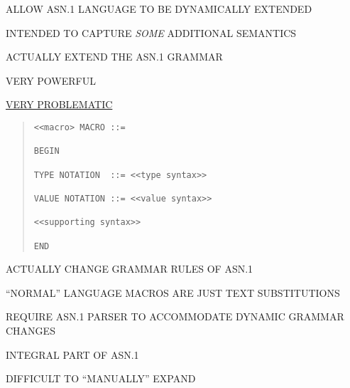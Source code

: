 

\begin{bwslide}

\begin{nrtc}
\item	ALLOW ASN.1 LANGUAGE TO BE DYNAMICALLY EXTENDED
\item	INTENDED TO CAPTURE {\em SOME} ADDITIONAL SEMANTICS
\item	ACTUALLY EXTEND THE ASN.1 GRAMMAR
\item	VERY POWERFUL
\item	\underline{VERY PROBLEMATIC}
\end{nrtc}
\end{bwslide}


\begin{bwslide}
\begin{quote}\small\begin{verbatim}
<<macro> MACRO ::=

BEGIN

TYPE NOTATION  ::= <<type syntax>>

VALUE NOTATION ::= <<value syntax>>

<<supporting syntax>>

END
\end{verbatim}\end{quote}
\end{bwslide}


\begin{bwslide}

\begin{nrtc}
\item	ACTUALLY CHANGE GRAMMAR RULES OF ASN.1
	\begin{nrtc}
	\item	``NORMAL'' LANGUAGE MACROS ARE JUST TEXT SUBSTITUTIONS
	\end{nrtc}
\item	REQUIRE ASN.1 PARSER TO ACCOMMODATE DYNAMIC GRAMMAR CHANGES
\item	INTEGRAL PART OF ASN.1
\item	DIFFICULT TO ``MANUALLY'' EXPAND
\end{nrtc}
\end{bwslide}


